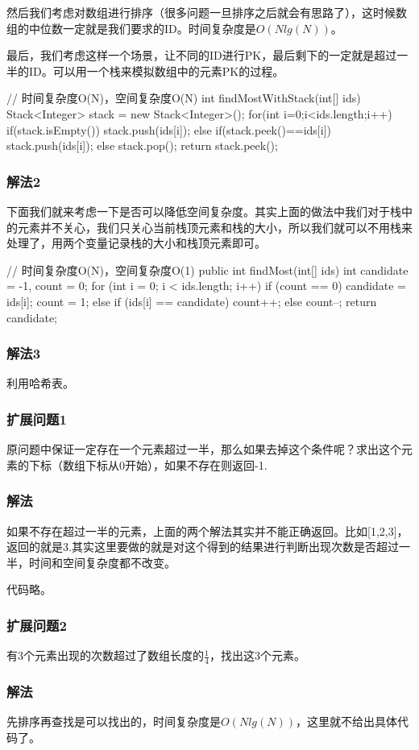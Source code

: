 然后我们考虑对数组进行排序（很多问题一旦排序之后就会有思路了），这时候数组的中位数一定就是我们要求的ID。时间复杂度是$O(Nlg(N))$。

最后，我们考虑这样一个场景，让不同的ID进行PK，最后剩下的一定就是超过一半的ID。可以用一个栈来模拟数组中的元素PK的过程。

\begin{Code}
// 时间复杂度O(N)，空间复杂度O(N)
int findMostWithStack(int[] ids) {
    Stack<Integer> stack = new Stack<Integer>();
    for(int i=0;i<ids.length;i++) {
        if(stack.isEmpty()) {
            stack.push(ids[i]);
		} else {
        if(stack.peek()==ids[i]) stack.push(ids[i]);
        else stack.pop();
    }
}
return stack.peek();
}
\end{Code}

\subsubsection{解法2}
下面我们就来考虑一下是否可以降低空间复杂度。其实上面的做法中我们对于栈中的元素并不关心，我们只关心当前栈顶元素和栈的大小，所以我们就可以不用栈来处理了，用两个变量记录栈的大小和栈顶元素即可。

\begin{Code}
// 时间复杂度O(N)，空间复杂度O(1)
public int findMost(int[] ids) {
    int candidate = -1, count = 0;
    for (int i = 0; i < ids.length; i++) {
        if (count == 0) {
            candidate = ids[i];
            count = 1;
        } else {
            if (ids[i] == candidate) count++;
            else count--;
        }
    }
    return candidate;
}
\end{Code}

\subsubsection{解法3}
利用哈希表。


\subsubsection{扩展问题1}
原问题中保证一定存在一个元素超过一半，那么如果去掉这个条件呢？求出这个元素的下标（数组下标从0开始），如果不存在则返回-1.

\subsubsection{解法}
如果不存在超过一半的元素，上面的两个解法其实并不能正确返回。比如[1,2,3]，返回的就是3.其实这里要做的就是对这个得到的结果进行判断出现次数是否超过一半，时间和空间复杂度都不改变。

代码略。
\subsubsection{扩展问题2}
有3个元素出现的次数超过了数组长度的$\frac{1}{4}$，找出这3个元素。

\subsubsection{解法}
先排序再查找是可以找出的，时间复杂度是$O(Nlg(N))$，这里就不给出具体代码了。